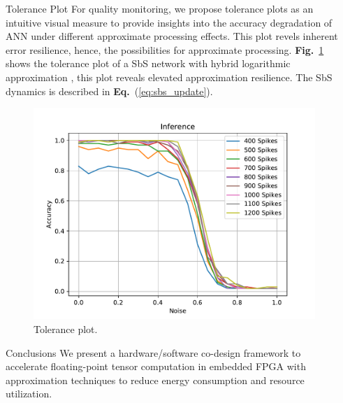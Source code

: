 \documentclass[final]{beamer}
\newlength{\sepwid}
\newlength{\onecolwid}
\newcommand\fig[1]{\textbf{Fig.}~\ref{#1}}
\newcommand\equ[1]{\textbf{Eq.}~(\ref{#1})}
\begin{document}
\begin{frame}[t]
\begin{columns}[t]
\begin{column}{\sepwid}\end{column} %

\begin{column}{\onecolwid} %


\begin{block}{Tolerance Plot}
	For quality monitoring, we propose tolerance plots as an intuitive
	visual measure to provide insights into the accuracy degradation of
	ANN under different approximate processing effects. This plot revels inherent error resilience, hence, the
	possibilities for approximate processing. \fig{fig:tolerance} shows the tolerance plot of a SbS network with hybrid logarithmic approximation \cite{nevarez2021accelerating}, this plot reveals elevated approximation resilience. The SbS dynamics is described in \equ{eq:sbs_update}.
	\begin{figure}
		\includegraphics[width=\linewidth]{../figures/accuracy_vs_spike_log.pdf}
		\caption{Tolerance plot.}
		\label{fig:tolerance}
	\end{figure}
\end{block}

\begin{block}{Conclusions}
We present a hardware/software co-design framework to accelerate floating-point tensor computation in embedded FPGA with approximation techniques to reduce energy consumption and resource utilization.


\end{block}
\end{column}
\end{columns}
\end{frame}
\end{document}
